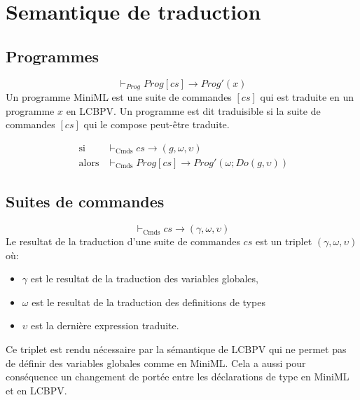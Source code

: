 \documentclass[
  12pt,
]{article}
\providecommand{\tightlist}{%
  \setlength{\itemsep}{0pt}\setlength{\parskip}{0pt}}
\begin{document}
\hypertarget{semantique-de-traduction}{%
  \section{Semantique de traduction}\label{semantique-de-traduction}}

\hypertarget{programmes-1}{%
  \subsection{Programmes}\label{programmes-1}}

\[ \vdash_{Prog} Prog[cs] \rightarrow Prog'(x) \] Un programme MiniML
est une suite de commandes \([cs]\) qui est traduite en un programme
\(x\) en LCBPV. Un programme est dit traduisible si la suite de
commandes \([cs]\) qui le compose peut-être traduite.

\begin{align*}
  \text{ si }    & \vdash_{\text{Cmds}} cs \rightarrow  (g,\omega,\upsilon)                \\
  \text{  alors} & \vdash_{\text{Cmds}} Prog[cs] \rightarrow  Prog'(\omega;Do(g,\upsilon))
\end{align*}

\hypertarget{suites-de-commandes}{%
  \subsection{Suites de commandes}\label{suites-de-commandes}}

\[ \vdash_{\text{Cmds}} cs \rightarrow (\gamma,\omega,\upsilon) \] Le
resultat de la traduction d'une suite de commandes \(cs\) est un triplet
\((\gamma,\omega,\upsilon)\) où:

\begin{itemize}
  \tightlist
  \item
        \(\gamma\) est le resultat de la traduction des variables globales,
  \item
        \(\omega\) est le resultat de la traduction des definitions de types
  \item
        \(\upsilon\) est la dernière expression traduite.
\end{itemize}

Ce triplet est rendu nécessaire par la sémantique de LCBPV qui ne permet
pas de définir des variables globales comme en MiniML. Cela a aussi pour
conséquence un changement de portée entre les déclarations de type en
MiniML et en LCBPV.
\end{document}
